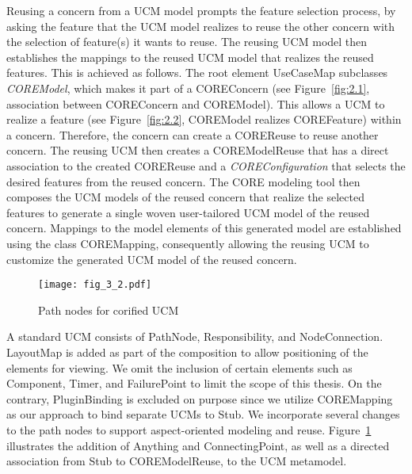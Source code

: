 Reusing a concern from a UCM model prompts the feature selection process, by asking the feature that the UCM model realizes to reuse the other concern with the selection of feature(s) it wants to reuse. The reusing UCM model then establishes the mappings to the reused UCM model that realizes the reused features. This is achieved as follows. The root element {\cls UseCaseMap} subclasses \textit{\cls COREModel}, which makes it part of a {\cls COREConcern} (see Figure~\ref{fig:2.1}, association between {\cls COREConcern} and {\cls COREModel}). This allows a UCM to realize a feature (see Figure~\ref{fig:2.2}, {\cls COREModel} realizes {\cls COREFeature}) within a concern. Therefore, the concern can create a {\cls COREReuse} to reuse another concern. The reusing UCM then creates a {\cls COREModelReuse} that has a direct association to the created {\cls COREReuse} and a \textit{\cls COREConfiguration} that selects the desired features from the reused concern. The CORE modeling tool then composes the UCM models of the reused concern that realize the selected features to generate a single woven user-tailored UCM model of the reused concern. Mappings to the model elements of this generated model are established using the class {\cls COREMapping}, consequently allowing the reusing UCM to customize the generated UCM model of the reused concern.

\begin{figure}
	\centering
	\texttt{[image: fig\_3\_2.pdf]}
	\caption{Path nodes for corified UCM}
	\label{fig:3.2}
\end{figure}

A standard UCM consists of {\cls PathNode}, {\cls Responsibility}, and {\cls NodeConnection}. {\cls LayoutMap} is added as part of the composition to allow positioning of the elements for viewing. We omit the inclusion of certain elements such as {\cls Component}, {\cls Timer}, and {\cls FailurePoint} to limit the scope of this thesis. On the contrary, {\cls PluginBinding} is excluded on purpose since we utilize {\cls COREMapping} as our approach to bind separate UCMs to {\cls Stub}. We incorporate several changes to the path nodes to support aspect-oriented modeling and reuse. Figure~\ref{fig:3.2} illustrates the addition of {\cls Anything} and {\cls ConnectingPoint}, as well as a directed association from {\cls Stub} to {\cls COREModelReuse}, to the UCM metamodel.

